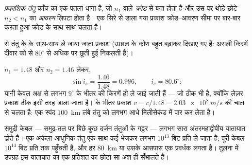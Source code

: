 \begin{definition}[प्रकाशिक तंतु]\label{def:g10:refraction:fiber}
\emph{प्रकाशिक तंतु} काँच का एक पतला धागा है, जो
$n_1$  वाले \emph{क्रोड} से बना होता है और उस
पर थोड़े छोटे  $n_2 < n_1$ का \emph{आवरण} लिपटा होता
है। एक सिरे से डाला गया प्रकाश क्रोड--आवरण सीमा पर बार-बार
 करता हुआ क्रोड के साथ-साथ चलता है।
\end{definition}

\begin{omfigure}

{\small {} से तंतु के  के
साथ-साथ ले जाया जाता प्रकाश (उछाल के कोण बहुत बढ़ाकर दिखाए गए हैं: असली
किरणें दीवार को  से $80^\circ$ से अधिक पर छूती हुई निकलती
हैं)।}
\end{omfigure}

\begin{example}[संख्याओं में एक तंतु]\label{ex:g10:refraction:fibernumbers}
$n_1 = 1.48$ और $n_2 = 1.46$ लेकर,
\[
\sin i_c = \frac{1.46}{1.48} = 0.986,
\qquad i_c = 80.6^\circ :
\]
यानी केवल अक्ष से लगभग $9^\circ$ के भीतर की किरणें ही ले जाई जाती हैं ---
जो ठीक भी है, क्योंकि लेज़र प्रकाश ठीक इसी तरह डाला जाता है।
 के भीतर प्रकाश $v = c/1.48 = \qty{2.03e8}{m/s}$ की चाल से चलता है: एक स्पंद
\qty{100}{km} लंबे तंतु को लगभग आधे मिलीसेकंड में पार कर लेता है।
\end{example}

\begin{remark}[आँकड़ा-कड़ियों की परिमाण की कोटि]\label{rem:g10:refraction:datarates}
समुद्री केबल --- समुद्र-तल पर बिछे कुछ दर्जन तंतुओं के गट्ठर --- लगभग
सारा अंतरमहाद्वीपीय यातायात ढोते हैं। एक अकेला आधुनिक तंतु एक साथ कई
 भेजकर लगभग $10^{13}$ बिट प्रति  ले जाता है; पूरी
केबल $10^{14}$ बिट प्रति  तक पहुँचती है, और हर \qty{80}{km} या उसके आसपास
एक प्रवर्धक लगता है। तुलना में उपग्रह इस यातायात का एक प्रतिशत का छोटा
सा अंश ही सँभालते हैं।
\end{remark}

